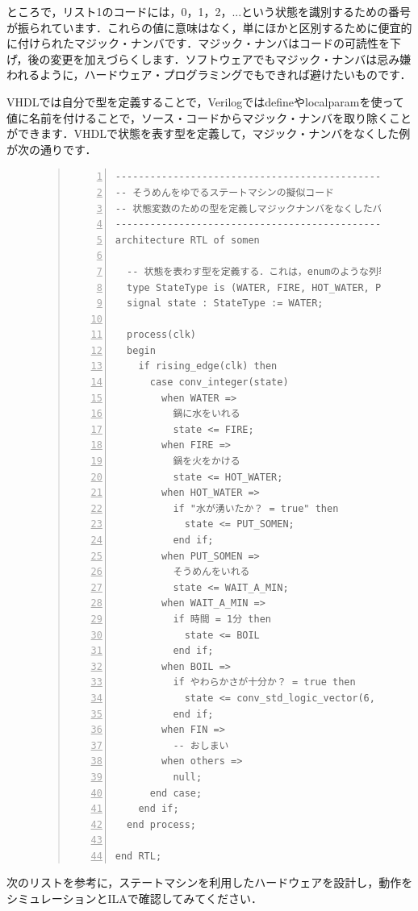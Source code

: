 \documentclass[a4paper,dvipdfmx]{jsarticle}
\begin{document}
ところで，リスト1のコードには，0，1，2，...という状態を識別するための番号が振られています．これらの値に意味はなく，単にほかと区別するために便宜的に付けられたマジック・ナンバです．マジック・ナンバはコードの可読性を下げ，後の変更を加えづらくします．ソフトウェアでもマジック・ナンバは忌み嫌われるように，ハードウェア・プログラミングでもできれば避けたいものです．

VHDLでは自分で型を定義することで，Verilogではdefineやlocalparamを使って値に名前を付けることで，ソース・コードからマジック・ナンバを取り除くことができます．VHDLで状態を表す型を定義して，マジック・ナンバをなくした例が次の通りです．

\begin{figure}[H]
\begin{quote}
\begin{Verbatim}[frame=single, numbers=left, baselinestretch=0.8]
---------------------------------------------------------
-- そうめんをゆでるステートマシンの擬似コード
-- 状態変数のための型を定義しマジックナンバをなくしたバージョン
---------------------------------------------------------
architecture RTL of somen

  -- 状態を表わす型を定義する．これは，enumのような列挙型に相当．
  type StateType is (WATER, FIRE, HOT_WATER, PUT_SOMEN, WAIT_A_MIN, BOIL, FIN)
  signal state : StateType := WATER;

  process(clk)
  begin
    if rising_edge(clk) then
      case conv_integer(state)
        when WATER =>
          鍋に水をいれる
          state <= FIRE;
        when FIRE =>
          鍋を火をかける
          state <= HOT_WATER;
        when HOT_WATER =>
          if "水が湧いたか？ = true" then
            state <= PUT_SOMEN;
          end if;
        when PUT_SOMEN =>
          そうめんをいれる
          state <= WAIT_A_MIN;
        when WAIT_A_MIN =>
          if 時間 = 1分 then
            state <= BOIL
          end if;
        when BOIL =>
          if やわらかさが十分か？ = true then
            state <= conv_std_logic_vector(6, 3);
          end if;
        when FIN =>
          -- おしまい
        when others =>
          null;
      end case; 
    end if;
  end process;

end RTL;
\end{Verbatim}
\end{quote}
\end{figure}

次のリストを参考に，ステートマシンを利用したハードウェアを設計し，動作をシミュレーションとILAで確認してみてください．
\end{document}
